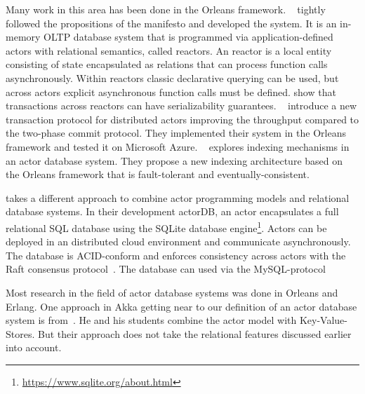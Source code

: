   Many work in this area has been done in the Orleans framework.
  \citeauthor{Shah:reactdb}~\cite{Shah:reactdb} tightly followed the propositions of the manifesto and developed the \reactdb{} system.
  It is an in-memory OLTP database system that is programmed via application-defined actors with relational semantics, called reactors.
  An reactor is a local entity consisting of state encapsulated as relations that can process function calls asynchronously.
  Within reactors classic declarative querying can be used, but across actors explicit asynchronous function calls must be defined.
  \citeauthor{Shah:reactdb} show that transactions across reactors can have serializability guarantees.
  \citeauthor{Eldeeb:transactions}~\cite{Eldeeb:transactions} introduce a new transaction protocol for distributed actors improving the throughput compared to the two-phase commit protocol.
  They implemented their system in the Orleans framework and tested it on Microsoft Azure.
  \citeauthor{Bernstein:indexing}~\cite{Bernstein:indexing} explores indexing mechanisms in an actor database system.
  They propose a new indexing architecture based on the Orleans framework that is fault-tolerant and eventually-consistent.

  \citeauthor{biokoda:actordb} takes a different approach to combine actor programming models and relational database systems.
  In their development actorDB, an actor encapsulates a full relational SQL database using the SQLite database engine\footnote{\url{https://www.sqlite.org/about.html}}.
  Actors can be deployed in an distributed cloud environment and communicate asynchronously.
  The database is ACID-conform and enforces consistency across actors with the Raft consensus protocol~\cite{raft}.
  The database can used via the MySQL-protocol

  Most research in the field of actor database systems was done in Orleans and Erlang.
  One approach in Akka getting near to our definition of an actor database system is from~\citeauthor{actorbase}.
  He and his students combine the actor model with Key-Value-Stores.
  But their approach does not take the relational features discussed earlier into account.
  